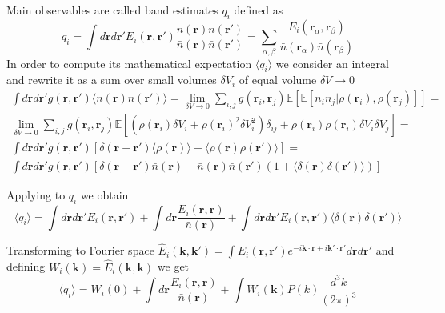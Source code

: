 \documentclass[12pt]{extarticle}
\numberwithin{problem}{section}
\numberwithin{theorem}{section}
\begin{document}
	Main observables are called band estimates $q_i$ defined as
	\begin{equation}
		\label{eq:band:def}
		q_i = \int d\mathbf{r} d\mathbf{r}' E_i(\mathbf{r}, \mathbf{r}')\frac{n(\mathbf{r})n(\mathbf{r}')}{\bar{n}(\mathbf{r})\bar{n}(\mathbf{r}')} = \sum_{\alpha, \beta}\frac{E_i(\mathbf{r}_\alpha, \mathbf{r}_\beta)}{\bar{n}(\mathbf{r}_\alpha)\bar{n}(\mathbf{r}_\beta)}
	\end{equation}
	In order to compute its mathematical expectation $\langle q_i\rangle$ we consider an integral and rewrite it as a sum over small volumes $\delta V_i$ of equal volume $\delta V\to 0$
	\begin{multline}
		\int d\mathbf{r} d\mathbf{r}' g(\mathbf{r}, \mathbf{r}') \langle n(\mathbf{r})n(\mathbf{r}')\rangle = \lim_{\delta V\to 0}\sum_{i, j} g(\mathbf{r}_i, \mathbf{r}_j) \mathbb{E}\left[\mathbb{E}[n_i n_j|\rho(\mathbf{r}_i),\rho(\mathbf{r}_j)]\right] = \\
		\lim_{\delta V\to 0}\sum_{i,j} g(\mathbf{r}_i, \mathbf{r}_j) \mathbb{E}\left[(\rho(\mathbf{r}_i)\delta V_i + \rho(\mathbf{r}_i)^2\delta V_i^2)\delta_{ij} + \rho(\mathbf{r}_i)\rho(\mathbf{r}_i)\delta V_i\delta V_j\right] = \\
		\int d\mathbf{r} d\mathbf{r}' g(\mathbf{r}, \mathbf{r}') \left[\delta(\mathbf{r} - \mathbf{r}')\langle\rho(\mathbf{r})\rangle + \langle\rho(\mathbf{r})\rho(\mathbf{r}')\rangle\right] = \\
		\int d\mathbf{r} d\mathbf{r}' g(\mathbf{r}, \mathbf{r}') \left[\delta(\mathbf{r} - \mathbf{r}')\bar{n}(\mathbf{r}) + \bar{n}(\mathbf{r})\bar{n}(\mathbf{r'})(1 + \langle\delta(\mathbf{r})\delta(\mathbf{r}')\rangle)\right]
	\end{multline}

	Applying to $q_i$ we obtain
	\begin{equation}
		\langle q_i\rangle = \int d\mathbf{r}d\mathbf{r}' E_i(\mathbf{r}, \mathbf{r}') + \int d\mathbf{r}\frac{E_i(\mathbf{r}, \mathbf{r})}{\bar{n}(\mathbf{r})} + \int d\mathbf{r}d\mathbf{r}' E_i(\mathbf{r}, \mathbf{r}')\langle\delta(\mathbf{r})\delta(\mathbf{r}')\rangle
	\end{equation}

	Transforming to Fourier space $\hat{E}_i(\mathbf{k}, \mathbf{k}') = \int E_i(\mathbf{r}, \mathbf{r}') e^{-i\mathbf{k}\cdot\mathbf{r} + i\mathbf{k}'\cdot\mathbf{r}'} d\mathbf{r}d\mathbf{r}'$ and defining $W_i(\mathbf{k}) = \hat{E}_i(\mathbf{k}, \mathbf{k})$ we get
	\begin{equation}
		\label{eq:band:mean}
		\langle q_i\rangle = W_i(0) + \int d\mathbf{r}\frac{E_i(\mathbf{r}, \mathbf{r})}{\bar{n}(\mathbf{r})} + \int W_i(\mathbf{k})P(k)\frac{d^3k}{(2\pi)^3}
	\end{equation}
\end{document}
